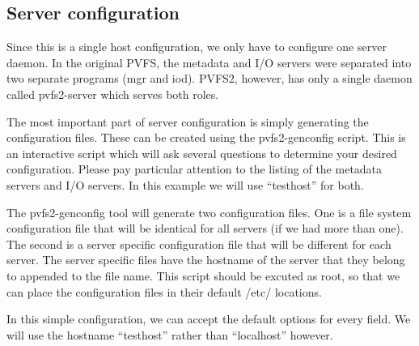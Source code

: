 \documentclass[11pt, letterpaper]{article}
\begin{document}
\subsection{Server configuration}

Since this is a single host configuration, we only have to configure
one server daemon.  In the original PVFS, the metadata and I/O servers
were separated into two separate programs (mgr and iod).  PVFS2,
however, has only a single daemon called pvfs2-server which serves
both roles.

The most important part of server configuration is simply generating
the configuration files.  These can be created using the
pvfs2-genconfig script.  This is an interactive script which will ask
several questions to determine your desired configuration.  Please pay
particular attention to the listing of the metadata servers and I/O
servers.  In this example we will use ``testhost'' for both.

The pvfs2-genconfig tool will generate two configuration files.  One
is a file system configuration file that will be identical for all
servers (if we had more than one).  The second is a server specific
configuration file that will be different for each server.  The server
specific files have the hostname of the server that they belong to
appended to the file name.  This script should be excuted as root, so
that we can place the configuration files in their default /etc/
locations.

In this simple configuration, we can accept the default options for
every field.  We will use the hostname ``testhost'' rather than
``localhost'' however.
\end{document}

